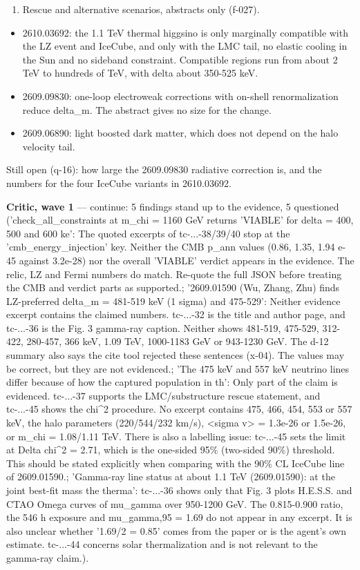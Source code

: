 \documentclass[11pt,a4paper]{article}
\begin{document}
\begin{enumerate}
  \item Rescue and alternative scenarios, abstracts only (f-027).
\end{enumerate}
\begin{itemize}
  \item 2610.03692: the 1.1 TeV thermal higgsino is only marginally compatible with the LZ event and IceCube, and only with the LMC tail, no elastic cooling in the Sun and no sideband constraint. Compatible regions run from about 2 TeV to hundreds of TeV, with delta about 350-525 keV.
  \item 2609.09830: one-loop electroweak corrections with on-shell renormalization reduce delta\_m. The abstract gives no size for the change.
  \item 2609.06890: light boosted dark matter, which does not depend on the halo velocity tail.
\end{itemize}
Still open (q-16): how large the 2609.09830 radiative correction is, and the numbers for the four IceCube variants in 2610.03692.

\textbf{Critic, wave 1} --- continue: 5 findings stand up to the evidence, 5 questioned ('check\_all\_constraints at m\_chi = 1160 GeV returns 'VIABLE' for delta = 400, 500 and 600 ke': The quoted excerpts of tc-...-38/39/40 stop at the 'cmb\_energy\_injection' key. Neither the CMB p\_ann values (0.86, 1.35, 1.94 e-45 against 3.2e-28) nor the overall 'VIABLE' verdict appears in the evidence. The relic, LZ and Fermi numbers do match. Re-quote the full JSON before treating the CMB and verdict parts as supported.; '2609.01590 (Wu, Zhang, Zhu) finds LZ-preferred delta\_m = 481-519 keV (1 sigma) and 475-529': Neither evidence excerpt contains the claimed numbers. tc-...-32 is the title and author page, and tc-...-36 is the Fig. 3 gamma-ray caption. Neither shows 481-519, 475-529, 312-422, 280-457, 366 keV, 1.09 TeV, 1000-1183 GeV or 943-1230 GeV. The d-12 summary also says the cite tool rejected these sentences (x-04). The values may be correct, but they are not evidenced.; 'The 475 keV and 557 keV neutrino lines differ because of how the captured population in th': Only part of the claim is evidenced. tc-...-37 supports the LMC/substructure rescue statement, and tc-...-45 shows the chi\textasciicircum{}2 procedure. No excerpt contains 475, 466, 454, 553 or 557 keV, the halo parameters (220/544/232 km/s), \textless{}sigma v\textgreater{} = 1.3e-26 or 1.5e-26, or m\_chi = 1.08/1.11 TeV. There is also a labelling issue: tc-...-45 sets the limit at Delta chi\textasciicircum{}2 = 2.71, which is the one-sided 95\% (two-sided 90\%) threshold. This should be stated explicitly when comparing with the 90\% CL IceCube line of 2609.01590.; 'Gamma-ray line status at about 1.1 TeV (2609.01590): at the joint best-fit mass the therma': tc-...-36 shows only that Fig. 3 plots H.E.S.S. and CTAO Omega curves of mu\_gamma over 950-1200 GeV. The 0.815-0.900 ratio, the 546 h exposure and mu\_gamma,95 = 1.69 do not appear in any excerpt. It is also unclear whether '1.69/2 = 0.85' comes from the paper or is the agent's own estimate. tc-...-44 concerns solar thermalization and is not relevant to the gamma-ray claim.).
\end{document}

